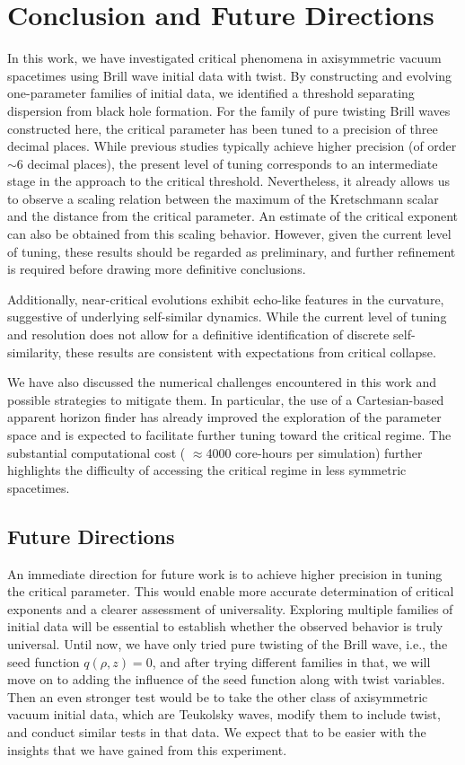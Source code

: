 \chapter{Conclusion and Future Directions}
In this work, we have investigated critical phenomena in axisymmetric vacuum spacetimes using Brill wave initial data with twist. By constructing and evolving one-parameter families of initial data, we identified a threshold separating dispersion from black hole formation. For the family of pure twisting Brill waves constructed here, the critical parameter has been tuned to a precision of three decimal places. 
While previous studies typically achieve higher precision (of order $\sim 6$ decimal places), the present level of tuning corresponds to an intermediate stage in the approach to the critical threshold. Nevertheless, it already allows us to observe a scaling relation between the maximum of the Kretschmann scalar and the distance from the critical parameter. An estimate of the critical exponent can also be obtained from this scaling behavior. However, given the current level of tuning, these results should be regarded as preliminary, and further refinement is required before drawing more definitive conclusions.

Additionally, near-critical evolutions exhibit echo-like features in the curvature, suggestive of underlying self-similar dynamics. While the current level of tuning and resolution does not allow for a definitive identification of discrete self-similarity, these results are consistent with expectations from critical collapse. 

We have also discussed the numerical challenges encountered in this work and possible strategies to mitigate them. In particular, the use of a Cartesian-based apparent horizon finder has already improved the exploration of the parameter space and is expected to facilitate further tuning toward the critical regime.
The substantial computational cost ( $\approx$4000 core-hours per simulation) further highlights the difficulty of accessing the critical regime in less symmetric spacetimes.

\section*{Future Directions}
An immediate direction for future work is to achieve higher precision in tuning the critical parameter. This would enable more accurate determination of critical exponents and a clearer assessment of universality. Exploring multiple families of initial data will be essential to establish whether the observed behavior is truly universal. Until now, we have only tried pure twisting of the Brill wave, i.e., the seed function $q(\rho,z) = 0$, and after trying different families in that, we will move on to adding the influence of the seed function along with twist variables. Then an even stronger test would be to take the other class of axisymmetric vacuum initial data, which are Teukolsky waves, modify them to include twist, and conduct similar tests in that data. We expect that to be easier with the insights that we have gained from this experiment.

